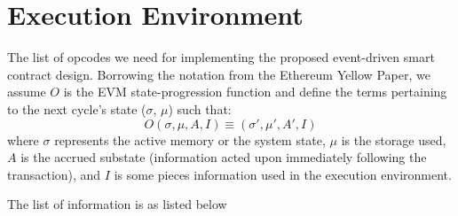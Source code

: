\documentclass{article}
\begin{document}
\newpage
\section{Execution Environment}
The list of opcodes we need for implementing the proposed event-driven smart contract design. Borrowing the notation from the Ethereum Yellow Paper, we assume $O$ is the EVM state-progression function and define the terms pertaining to the next cycle’s state ($\sigma$, $\mu$) such that:
\begin{equation*}
    O(\sigma, \mu, A, I) \equiv (\sigma', \mu', A', I)
\end{equation*}
where $\sigma$ represents the active memory or the system state, $\mu$ is the storage used, $A$ is the accrued substate (information acted upon immediately following the transaction), and $I$ is some pieces information used in the execution environment. 

The list of information is as listed below\\
\end{document}
